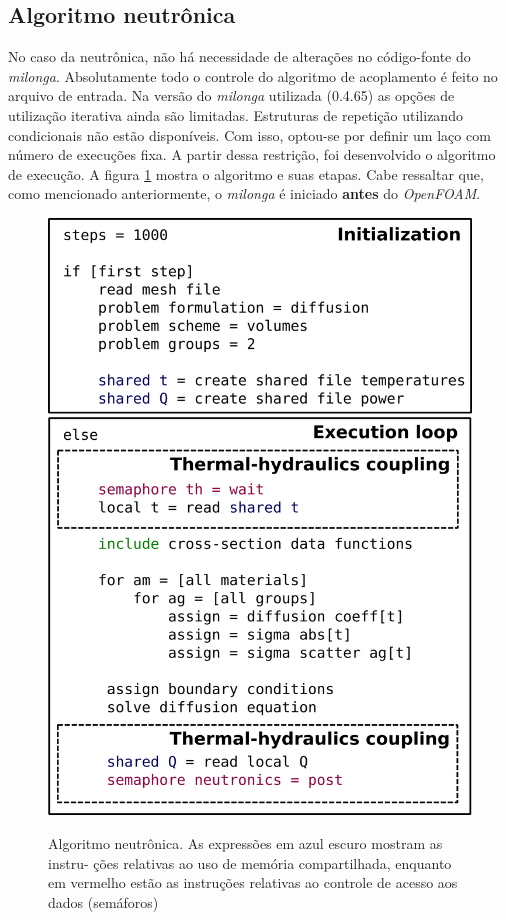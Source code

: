 \subsection{Algoritmo neutrônica}

No caso da neutrônica, não há necessidade de alterações no código-fonte do \textit{milonga}. Absolutamente
todo o controle do algoritmo de acoplamento é feito no arquivo de entrada. Na versão do
\textit{milonga} utilizada (0.4.65) as opções de utilização iterativa ainda são limitadas. Estruturas
de repetição utilizando condicionais não estão disponíveis. Com isso, optou-se por definir um laço com número
de execuções fixa. A partir dessa restrição, foi desenvolvido o algoritmo de execução. A figura
\ref{fig:algo_neutronica} mostra o algoritmo e suas etapas. Cabe ressaltar que, como mencionado anteriormente,
o \textit{milonga} é iniciado \textbf{antes} do \textit{OpenFOAM}.

\begin{figure}[htb]
  \caption{Algoritmo neutrônica. As expressões em azul escuro mostram as instru-
ções relativas ao uso de memória compartilhada, enquanto em vermelho estão
as instruções relativas ao controle de acesso aos dados (semáforos)}
  \centering\includegraphics[scale=0.5]{figuras/algoritmos_milonga.png}
  \label{fig:algo_neutronica}
\end{figure}

